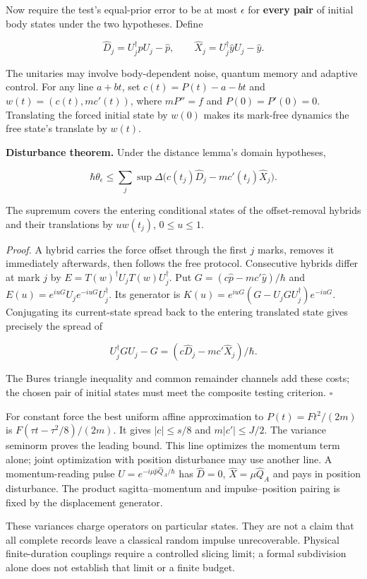 \documentclass[11pt,a4paper]{article}
\begin{document}
Now require the test's equal-prior error to be at most \(\epsilon\) for
\textbf{every pair} of initial body states under the two hypotheses.
Define

\[\hat D_j=U_j^\dagger\hat pU_j-\hat p,\qquad
\hat X_j=U_j^\dagger\hat yU_j-\hat y.\]

The unitaries may involve body-dependent noise, quantum memory and
adaptive control. For any line \(a+bt\), set \(c(t)=P(t)-a-bt\) and
\(w(t)=(c(t),mc'(t))\), where \(mP''=f\) and \(P(0)=P'(0)=0\).
Translating the forced initial state by \(w(0)\) makes its mark-free
dynamics the free state's translate by \(w(t)\).

\textbf{Disturbance theorem.} Under the distance lemma's domain
hypotheses,

\[\hbar\theta_\epsilon\le
 \sum_j\sup\Delta\bigl(c(t_j)\hat D_j-mc'(t_j)\hat X_j\bigr).\]

The supremum covers the entering conditional states of the
offset-removal hybrids and their translations by \(u w(t_j)\),
\(0\le u\le1\).

\emph{Proof.} A hybrid carries the force offset through the first \(j\)
marks, removes it immediately afterwards, then follows the free
protocol. Consecutive hybrids differ at mark \(j\) by
\(E=T(w)^\dagger U_jT(w)U_j^\dagger\). Put
\(G=(c\hat p-mc'\hat y)/\hbar\) and
\(E(u)=e^{iuG}U_je^{-iuG}U_j^\dagger\). Its generator is
\(K(u)=e^{iuG}(G-U_jGU_j^\dagger)e^{-iuG}\). Conjugating its
current-state spread back to the entering translated state gives
precisely the spread of

\[U_j^\dagger GU_j-G=(c\hat D_j-mc'\hat X_j)/\hbar.\]

The Bures triangle inequality and common remainder channels add these
costs; the chosen pair of initial states must meet the composite testing
criterion. \(\square\)

For constant force the best uniform affine approximation to
\(P(t)=Ft^2/(2m)\) is \(F(\tau t-\tau^2/8)/(2m)\). It gives
\(|c|\le s/8\) and \(m|c'|\le J/2\). The variance seminorm proves the
leading bound. This line optimizes the momentum term alone; joint
optimization with position disturbance may use another line. A
momentum-reading pulse \(U=e^{-i\mu\hat p\hat Q_A/\hbar}\) has
\(\hat D=0\), \(\hat X=\mu\hat Q_A\) and pays in position disturbance.
The product sagitta--momentum and impulse--position pairing is fixed by
the displacement generator.

These variances charge operators on particular states. They are not a
claim that all complete records leave a classical random impulse
unrecoverable. Physical finite-duration couplings require a controlled
slicing limit; a formal subdivision alone does not establish that limit
or a finite budget.
\end{document}
